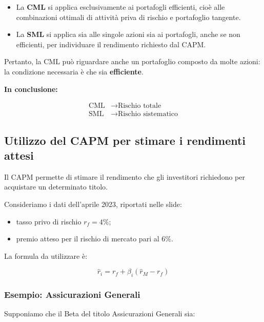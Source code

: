 \begin{itemize}
    \item La \textbf{CML} si applica esclusivamente
    ai portafogli efficienti, cioè alle combinazioni
    ottimali di attività priva di rischio
    e portafoglio tangente.

    \item La \textbf{SML} si applica sia alle singole azioni
    sia ai portafogli, anche se non efficienti,
    per individuare il rendimento richiesto dal CAPM.
\end{itemize}

\noindent Pertanto, la CML può riguardare anche
un portafoglio composto da molte azioni:
la condizione necessaria è che sia
\textbf{efficiente}.

\medskip

\noindent \textbf{In conclusione:}

\[
\boxed{
\begin{aligned}
\text{CML}&\rightarrow\text{Rischio totale}\\
\text{SML}&\rightarrow\text{Rischio sistematico}
\end{aligned}
}
\]


\subsection{Utilizzo del CAPM per stimare i rendimenti attesi}

\noindent Il CAPM permette di stimare il rendimento
che gli investitori richiedono per acquistare
un determinato titolo.

\medskip

\noindent Consideriamo i dati dell'aprile 2023,
riportati nelle slide:

\begin{itemize}
    \item tasso privo di rischio $r_f=4\%$;
    \item premio atteso per il rischio
    di mercato pari al $6\%$.
\end{itemize}

\noindent La formula da utilizzare è:

\[
\boxed{
\hat{r}_i=r_f+\beta_i(\hat{r}_M-r_f)
}
\]

\subsubsection*{Esempio: Assicurazioni Generali}

\noindent Supponiamo che il Beta del titolo
Assicurazioni Generali sia:

